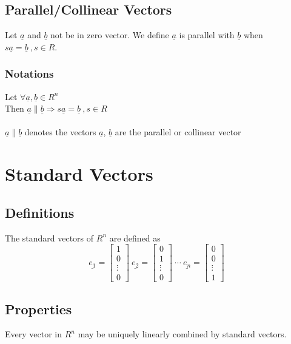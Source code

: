 \documentclass[12pt]{article}
\begin{document}
\subsection{Parallel/Collinear Vectors}
Let $\underline{a}$ and $\underline{b}$ not be in zero vector. We define $\underline{a}$ is parallel with $\underline{b}$ when $s\underline{a} = \underline{b}\ ,s \in R$.\\
\subsubsection{Notations}
Let $\forall \underline{a},\underline{b} \in R^n$\\

Then $\underline{a} \parallel \underline{b} \Rightarrow s\underline{a} = \underline{b}\ ,s \in R$\\\\
$\underline{a} \parallel \underline{b}$ denotes the vectors $\underline{a}$, $\underline{b}$ are the parallel or collinear vector\\

\section{Standard Vectors}
\subsection{Definitions}
The standard vectors of $R^n$ are defined as
\begin{equation}
\underline{e_1} = \left[
\begin{array}{c}
1\\
0\\
\vdots\\
0
\end{array}
\right]\ 
\underline{e_2} = \left[
\begin{array}{c}
0\\
1\\
\vdots\\
0
\end{array}
\right]\ \cdots \ 
\underline{e_n} = \left[
\begin{array}{c}
0\\
0\\
\vdots\\
1
\end{array}
\right]\ 
\end{equation}
\subsection{Properties}
Every vector in $R^n$ may be uniquely linearly combined by standard vectors.
\end{document}

